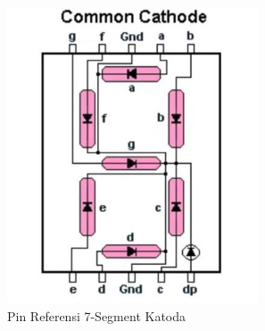 \begin{figure}[H]
    \centering
    \includegraphics[width=0.4\linewidth]{P1/img/7segment.png}
    \caption{Pin Referensi 7-Segment Katoda}
    \label{fig:Referensi7Segment}
\end{figure}
